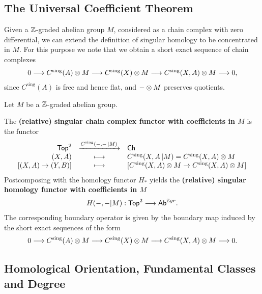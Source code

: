 	\newpage
	\subsection{The Universal Coefficient Theorem}

	Given a $\mathbb{Z}$-graded abelian group $M$, considered as a chain complex with zero differential, we can extend the definition of singular homology to be concentrated in $M$. For this purpose we note that we obtain a short exact sequence of chain complexes
	\begin{align*}
		0 --> C^\text{sing}(A) \otimes M --> C^\text{sing}(X) \otimes M --> C^\text{sing}(X,A) \otimes M --> 0,
	\end{align*}
	since $C^\text{sing}(A)$ is free and hence flat, and $- \otimes M$ preserves quotients.

	\begin{definition}
		Let $M$ be a $\mathbb{Z}$-graded abelian group.

		The \textbf{(relative) singular chain complex functor with coefficients in $M$} is the functor
		\begin{equation*}
			\begin{array}{rcl}
				\textsf{Top}^2 & \xrightarrow{C^\text{sing}(-,- \,| M)} & \textsf{Ch}\\
				(X,A) & \longmapsto & C^\text{sing}(X,A \,| M) = C^\text{sing}(X,A) \otimes M\\
				{[(X,A)\rightarrow(Y,B)]} & \longmapsto & {[C^\text{sing}(X,A) \otimes M \rightarrow C^\text{sing}(X,A) \otimes M]}
			\end{array}
		\end{equation*}
		Postcomposing with the homology functor $H_{*}$ yields the \textbf{(relative) singular homology functor with coefficients in $M$}
		\begin{align*}
			H(-,- | M): \textsf{Top}^2 --> \textsf{Ab}^{\mathbb{Z} gr}.
		\end{align*}
		The corresponding boundary operator is given by the boundary map induced by the short exact sequences of the form
		\begin{align*}
			0 --> C^\text{sing}(A) \otimes M --> C^\text{sing}(X) \otimes M --> C^\text{sing}(X,A) \otimes M --> 0.
		\end{align*}
	\end{definition}




	\newpage
	\subsection{Homological Orientation, Fundamental Classes and Degree}

